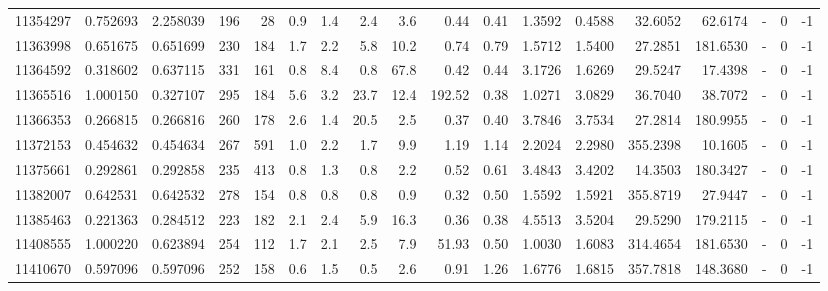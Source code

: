 \begin{tabular}{rrrrrrrrrrrrrrrlrr}
  11354297 & 0.752693 &   2.258039 &  196 &   28 &      0.9 &      1.4 &     2.4 &      3.6 &       0.44 &        0.41 &  1.3592 &  0.4588 &   32.6052 &   62.6174 &             - &        0 &         -1 \\
  11363998 & 0.651675 &   0.651699 &  230 &  184 &      1.7 &      2.2 &     5.8 &     10.2 &       0.74 &        0.79 &  1.5712 &  1.5400 &   27.2851 &  181.6530 &             - &        0 &         -1 \\
  11364592 & 0.318602 &   0.637115 &  331 &  161 &      0.8 &      8.4 &     0.8 &     67.8 &       0.42 &        0.44 &  3.1726 &  1.6269 &   29.5247 &   17.4398 &             - &        0 &         -1 \\
  11365516 & 1.000150 &   0.327107 &  295 &  184 &      5.6 &      3.2 &    23.7 &     12.4 &     192.52 &        0.38 &  1.0271 &  3.0829 &   36.7040 &   38.7072 &             - &        0 &         -1 \\
  11366353 & 0.266815 &   0.266816 &  260 &  178 &      2.6 &      1.4 &    20.5 &      2.5 &       0.37 &        0.40 &  3.7846 &  3.7534 &   27.2814 &  180.9955 &             - &        0 &         -1 \\
  11372153 & 0.454632 &   0.454634 &  267 &  591 &      1.0 &      2.2 &     1.7 &      9.9 &       1.19 &        1.14 &  2.2024 &  2.2980 &  355.2398 &   10.1605 &             - &        0 &         -1 \\
  11375661 & 0.292861 &   0.292858 &  235 &  413 &      0.8 &      1.3 &     0.8 &      2.2 &       0.52 &        0.61 &  3.4843 &  3.4202 &   14.3503 &  180.3427 &             - &        0 &         -1 \\
  11382007 & 0.642531 &   0.642532 &  278 &  154 &      0.8 &      0.8 &     0.8 &      0.9 &       0.32 &        0.50 &  1.5592 &  1.5921 &  355.8719 &   27.9447 &             - &        0 &         -1 \\
  11385463 & 0.221363 &   0.284512 &  223 &  182 &      2.1 &      2.4 &     5.9 &     16.3 &       0.36 &        0.38 &  4.5513 &  3.5204 &   29.5290 &  179.2115 &             - &        0 &         -1 \\
  11408555 & 1.000220 &   0.623894 &  254 &  112 &      1.7 &      2.1 &     2.5 &      7.9 &      51.93 &        0.50 &  1.0030 &  1.6083 &  314.4654 &  181.6530 &             - &        0 &         -1 \\
  11410670 & 0.597096 &   0.597096 &  252 &  158 &      0.6 &      1.5 &     0.5 &      2.6 &       0.91 &        1.26 &  1.6776 &  1.6815 &  357.7818 &  148.3680 &             - &        0 &         -1 \\

\end{tabular}
